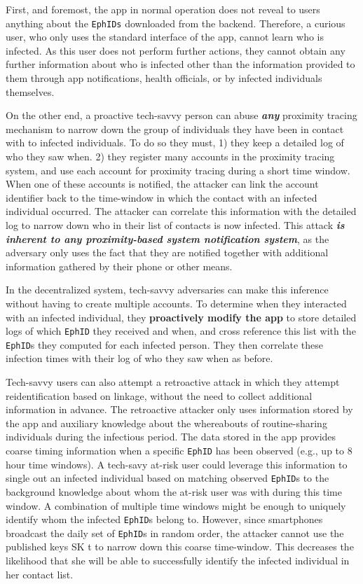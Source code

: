 \documentclass[12pt,a4paper]{article}
\begin{document}
First, and foremost, the app in normal operation does not reveal to users anything about the \texttt{EphIDs} downloaded from the backend. Therefore, a curious user, who only uses the standard interface of the app, cannot learn who is infected. As this user does not perform further actions, they cannot obtain any further information about who is infected other than the information provided to them through app notifications, health officials, or by infected individuals themselves.

On the other end, a proactive tech-savvy person can abuse \textbf{\textit{any}} proximity tracing mechanism to narrow down the group of individuals they have been in contact with to infected individuals. To do so they must, 1) they keep a detailed log of who they saw when. 2) they register many accounts in the proximity tracing system, and use each account for proximity tracing during a short time window. When one of these accounts is notified, the attacker can link the account identifier back to the time-window in which the contact with an infected individual occurred. The attacker can correlate this information with the detailed log to narrow down who in their list of contacts is now infected. This attack \textbf{\textit{is inherent to any proximity-based system notification system}}, as the adversary only uses the fact that they are notified together with additional information gathered by their phone or other means.
 
In the decentralized system, tech-savvy adversaries can make this inference without having
to create multiple accounts. To determine when they interacted with an infected individual, they \textbf{proactively modify the app} to store detailed logs of which \texttt{EphID} they received and when, and cross reference this list with the \texttt{EphID}s they computed for each infected person. They then correlate these infection times with their log of who they saw when as before.

Tech-savvy users can also attempt a retroactive attack in which they attempt reidentification based on linkage, without the need to collect additional information in advance. The retroactive attacker only uses information stored by the app and auxiliary knowledge about the whereabouts of routine-sharing individuals during the infectious period. The data stored in the app provides coarse timing information when a specific \texttt{EphID} has been observed (e.g., up to 8 hour time windows). A tech-savy at-risk user could leverage this information to single out an infected individual based on matching observed \texttt{EphID}s to the background knowledge about whom the at-risk user was with during this time window. A combination of multiple time windows might be enough to uniquely identify whom the infected \texttt{EphID}s belong to. However, since smartphones broadcast the daily set of \texttt{EphID}s in random order, the attacker cannot use the published keys SK t to narrow down this coarse time-window. This decreases the likelihood that she will be able to successfully identify the infected individual in her contact list.
\end{document}
